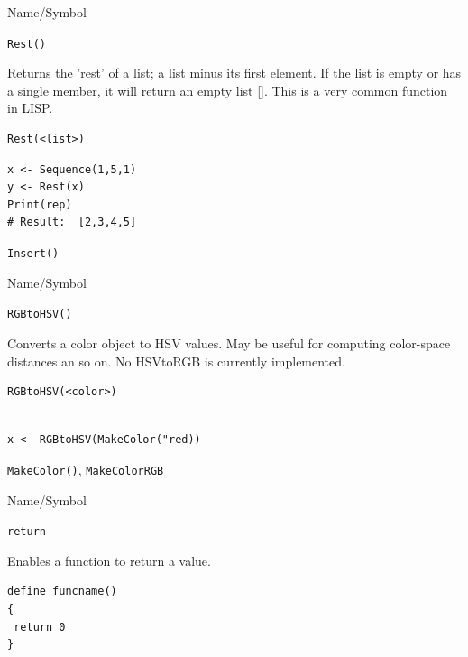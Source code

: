 \begin{desc}{Name/Symbol}
\item[Name/Symbol]  \verb+Rest()+

\item[Description]  Returns the 'rest' of a list; a list minus its
  first element.  If the list is empty or has a single member, it will
  return an empty list [].  This is a very common function in LISP.

\item[Usage]        	
\begin{verbatim}
Rest(<list>)
\end{verbatim}
			  
\item[Example]     	
\begin{verbatim}
x <- Sequence(1,5,1)
y <- Rest(x)
Print(rep)
# Result:  [2,3,4,5]
\end{verbatim}

\item[See Also]	
\verb+Insert()+
\end{desc}

\begin{desc}{Name/Symbol}
\item[Name/Symbol]  \verb+RGBtoHSV()+

\item[Description]  Converts a color object to HSV values.  May be useful for computing color-space
distances an so on.  No HSVtoRGB is currently implemented.

\item[Usage]        	
\begin{verbatim}
RGBtoHSV(<color>)
\end{verbatim}
			  
\item[Example]     	
\begin{verbatim}

x <- RGBtoHSV(MakeColor("red))

\end{verbatim}

\item[See Also]	
   \verb+MakeColor()+, \verb+MakeColorRGB+
\end{desc}

\begin{desc}{Name/Symbol}
\item[Name/Symbol] 	\verb+return+

\item[Description]  	Enables a function to return a value.

\item[Usage]
\begin{verbatim}
define funcname()
{
 return 0
}
\end{verbatim}

\item[Example]	

\item[See Also]	
\end{desc}

